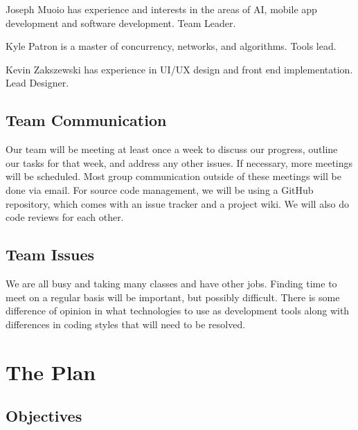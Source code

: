 \documentclass{report}
\begin{document}
Joseph Muoio has experience and interests in the areas of AI, mobile app
development and software development. Team Leader.

Kyle Patron is a master of concurrency, networks, and algorithms. Tools lead.

Kevin Zakszewski has experience in UI/UX design and front end implementation. Lead Designer.



\subsection*{Team Communication}

Our team will be meeting at least once a week to discuss our progress, outline
our tasks for that week, and address any other issues. If necessary, more
meetings will be scheduled. Most group communication outside of these meetings
will be done via email. For source code management, we will be using a GitHub
repository, which comes with an issue tracker and a project wiki. We will also do code reviews for each other.

\subsection*{Team Issues}

We are all busy and taking many classes and have other jobs. Finding time to
meet on a regular basis will be important, but possibly difficult. There is
some difference of opinion in what technologies to use as development tools
along with differences in coding styles that will need to be resolved. 

\newpage
\section*{\centering The Plan}

\subsection*{Objectives}
\end{document}

